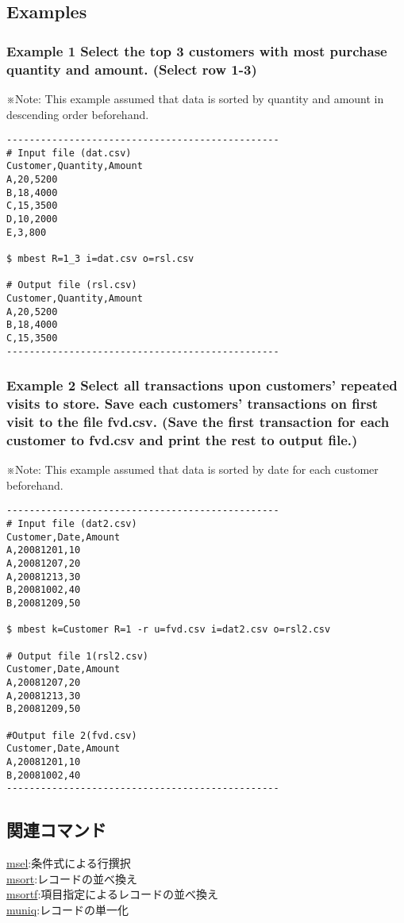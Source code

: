 \documentclass[a4paper]{jarticle}
\begin{document}
\subsection*{Examples}
\subsubsection*{Example 1 Select the top 3 customers with most purchase quantity and amount. (Select row 1-3)}
※Note: This example assumed that data is sorted by quantity and amount in descending order beforehand. 

\begin{verbatim}
------------------------------------------------
# Input file (dat.csv)
Customer,Quantity,Amount
A,20,5200 
B,18,4000   
C,15,3500 
D,10,2000 
E,3,800 

$ mbest R=1_3 i=dat.csv o=rsl.csv

# Output file (rsl.csv)
Customer,Quantity,Amount 
A,20,5200
B,18,4000
C,15,3500
------------------------------------------------
\end{verbatim}

\subsubsection*{Example 2 Select all transactions upon customers' repeated visits to store. Save each customers'  transactions on first visit to the file fvd.csv. (Save the first transaction for each customer to fvd.csv and print the rest to output file.)}
※Note: This example assumed that data is sorted by date for each customer beforehand. 

\begin{verbatim}
------------------------------------------------
# Input file (dat2.csv)
Customer,Date,Amount
A,20081201,10
A,20081207,20
A,20081213,30
B,20081002,40
B,20081209,50

$ mbest k=Customer R=1 -r u=fvd.csv i=dat2.csv o=rsl2.csv

# Output file 1(rsl2.csv)
Customer,Date,Amount
A,20081207,20
A,20081213,30
B,20081209,50

#Output file 2(fvd.csv)
Customer,Date,Amount
A,20081201,10
B,20081002,40
------------------------------------------------
\end{verbatim}

\subsection*{関連コマンド}
\noindent
\href{run:msel.pdf}{msel}:条件式による行撰択\\
\href{run:msort.pdf}{msort}:レコードの並べ換え\\
\href{run:msortf.pdf}{msortf}:項目指定によるレコードの並べ換え\\
\href{run:muniq.pdf}{muniq}:レコードの単一化\\
\end{document}

